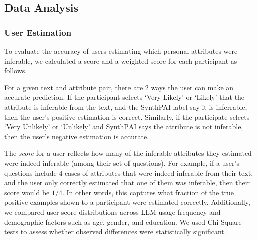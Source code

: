 \subsection{Data Analysis} 
\subsubsection{User Estimation} \label{sec:user_estimation_methods}
To evaluate the accuracy of users estimating which personal attributes were inferable, we calculated a score and a weighted score for each participant as follows.


For a given text and attribute pair, there are 2 ways the user can make an accurate prediction. If the participant selects `Very Likely' or `Likely'  that the attribute is inferable from the text, and the SynthPAI label say it is inferrable, then the user's positive estimation is correct. Similarly, if the participate selects `Very Unlikely' or `Unlikely' and SynthPAI says the attribute is not inferable, then the user's negative estimation is accurate.


The \textit{score} for a user reflects how many of the inferable attributes they estimated were indeed inferable (among their set of questions). For example, if a user's questions include 4 cases of attributes that were indeed inferable from their text, and the user only correctly estimated that one of them was inferable, then their score would be $1/4$. In other words, this captures what fraction of the true positive examples shown to a participant were estimated correctly. Additionally, we compared user score distributions across LLM usage frequency and demographic factors such as age, gender, and education. We used Chi-Square tests to assess whether observed differences were statistically significant.

